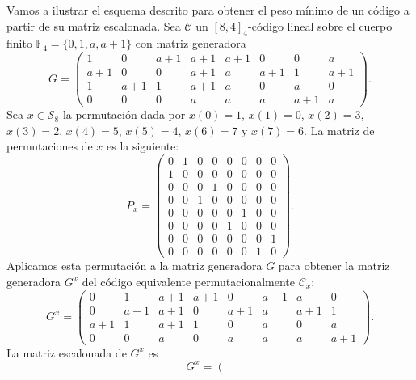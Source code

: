 \begin{exampleth}
    Vamos a ilustrar el esquema descrito para obtener el peso mínimo de un código a partir de su matriz escalonada. Sea $\mathcal{C}$ un $[8, 4]_4$-código lineal sobre el cuerpo finito $\mathbb{F}_4 = \{ 0, 1, a, a + 1 \}$ con matriz generadora
    \[ G =
        \left(
        \begin{array}{cccccccc} 
            1 & 0 & a+1 & a+1 & a+1 & 0 & 0 & a  \\
            a+1 & 0 & 0 & a+1 & a & a+1 & 1 & a+1  \\
            1 & a+1 & 1 & a+1 & a & 0 & a & 0  \\
            0 & 0 & 0 & a & a & a & a+1 & a
        \end{array}
        \right).
    \]
    Sea $x \in \mathcal{S}_8$ la permutación dada por $x(0) = 1$, $x(1) = 0$, $x(2) = 3$, $x(3) = 2$, $x(4) = 5$, $x(5) = 4$, $x(6) = 7$ y $x(7) = 6$. La matriz de permutaciones de $x$ es la siguiente:
    \[ P_x =
        \left(
        \begin{array}{cccccccc} 
            0 & 1 & 0 & 0 & 0 & 0 & 0 & 0  \\
            1 & 0 & 0 & 0 & 0 & 0 & 0 & 0  \\
            0 & 0 & 0 & 1 & 0 & 0 & 0 & 0  \\
            0 & 0 & 1 & 0 & 0 & 0 & 0 & 0  \\
            0 & 0 & 0 & 0 & 0 & 1 & 0 & 0  \\
            0 & 0 & 0 & 0 & 1 & 0 & 0 & 0  \\
            0 & 0 & 0 & 0 & 0 & 0 & 0 & 1  \\
            0 & 0 & 0 & 0 & 0 & 0 & 1 & 0 
        \end{array}
        \right).
    \]
    Aplicamos esta permutación a la matriz generadora $G$ para obtener la matriz generadora $G^x$ del código equivalente permutacionalmente $\mathcal{C}_x$:
    \[ G^x =
        \left(
        \begin{array}{cccccccc} 
            0 & 1 & a+1 & a+1 & 0 & a+1 & a & 0  \\
            0 & a+1 & a+1 & 0 & a+1 & a & a+1 & 1  \\
            a+1 & 1 & a+1 & 1 & 0 & a & 0 & a  \\
            0 & 0 & a & 0 & a & a & a & a+1
        \end{array}
        \right).
    \]
    La matriz escalonada de $G^x$ es
    \[ G^x =
        \left(
        \begin{array}{cccccccc} 

\end{array}\]
\end{exampleth}
